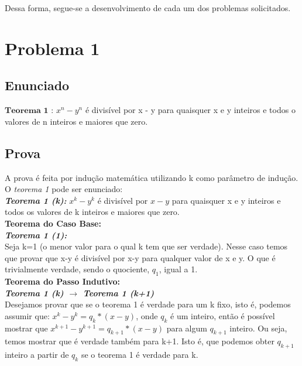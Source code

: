 \documentclass[twoside]{article}
\begin{document}
\begin{multicols}{2}
Dessa forma, segue-se a desenvolvimento de cada um dos problemas solicitados.\\

\newpage
\section{Problema 1}

\subsection{ Enunciado }
\indent  $\mathbf{Teorema}$ $\mathbf{1}$ : $x^n - y^n$ é divisível por x - y para quaisquer x e y inteiros e todos o valores de n inteiros e maiores que zero.


\subsection{ Prova }
\indent A prova é feita por indução matemática utilizando k como parâmetro de indução. O \textit{teorema 1} pode ser enunciado:\\

\textit{\textbf{Teorema 1 (k):}} $x^k-y^k $ é divisível por $x-y$ para quaisquer x e y inteiros e todos os valores de k inteiros e maiores que zero.\\

\textbf{Teorema do Caso Base:}\\

\textit{\textbf{Teorema 1 (1):}}\\
Seja k=1 (o menor valor para o qual k tem que ser verdade). Nesse caso temos que provar que x-y é divisível por x-y para qualquer valor de x e y. O que é trivialmente verdade, sendo o quociente, $q_1$, igual a 1.\\

\textbf{Teorema do Passo Indutivo:}\\

\textit{\textbf{Teorema 1 (k) $\rightarrow$ Teorema 1 (k+1)}}\\
Desejamos provar que se o teorema 1 é verdade para um k fixo, isto é, podemos assumir que: $x^k-y^k=q_k*(x-y)$, onde $q_k$ é um inteiro, então é possível mostrar que $x^{k+1}-y^{k+1}=q_{k+1}*(x-y)$ para algum $q_{k+1}$ inteiro. Ou seja, temos mostrar que é verdade também para k+1. Isto é, que podemos obter $q_{k+1}$ inteiro a partir de $q_k$ se o teorema 1 é verdade para k.\\


\end{multicols}
\end{document}
